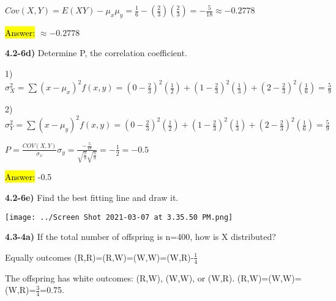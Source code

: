 \documentclass{article}
\begin{document}
$Cov(X,Y)=E(XY)-\mu_{x}\mu_{y}=\frac{1}{6}-(\frac{2}{3})(\frac{2}{3})=-\frac{5}{18} \approx -0.2778$

\vspace{2mm}


\hl{Answer:} $\approx -0.2778$


\vspace{4mm}

\textbf{ 4.2-6d)} Determine P, the correlation coefficient.

\vspace{2mm}


1) $\sigma^{2}_{X}=\sum(x-\mu_{x})^{2} f(x,y)=(0-\frac{2}{3})^{2}(\frac{1}{2})+(1-\frac{2}{3})^{2}(\frac{1}{3})+(2-\frac{2}{3})^{2}(\frac{1}{6})=\frac{5}{9}$

\vspace{4mm}

2) $\sigma^{2}_{Y}=\sum(x-\mu_{y})^{2} f(x,y)=(0-\frac{2}{3})^{2}(\frac{1}{2})+(1-\frac{2}{3})^{2}(\frac{1}{3})+(2-\frac{2}{3})^{2}(\frac{1}{6})=\frac{5}{9}$

\vspace{4mm}

$P=\frac{COV(X,Y)}{\sigma_{x}}\sigma_{y}=\frac{-\frac{5}{18}}{\sqrt{\frac{5}{9}}\sqrt{\frac{5}{9}}}=-\frac{1}{2}=-0.5$


\hl{Answer:} -0.5


\vspace{5mm}

\textbf{ 4.2-6e)} Find the best fitting line and draw it.

\vspace{2mm}

\texttt{[image: ../Screen Shot 2021-03-07 at 3.35.50 PM.png]}





\newpage
\textbf{4.3-4a)} If the total number of offspring is n=400, how is X distributed?

\vspace{2mm}

Equally outcomes  (R,R)=(R,W)=(W,W)=(W,R)-$\frac{1}{4}$


\vspace{2mm}

The offspring has white outcomes: (R,W), (W,W), or (W,R). (R,W)=(W,W)=(W,R)=$\frac{3}{4}$=0.75.

\vspace{2mm}
\end{document}
